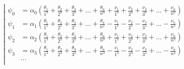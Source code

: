 \begin{equation*} \left| \begin{aligned}
\psi_0 &= \alpha_0
  \left(
  \frac{\theta_1}{1^0}
+ \frac{\theta_2}{2^0}
+ \frac{\theta_3}{3^0}
+ \ldots
+ \frac{\theta_n}{n^0}
+ \frac{\nu_1}{1^0}
+ \frac{\nu_2}{2^0}
+ \frac{\nu_3}{3^0}
+ \ldots
+ \frac{\nu_n}{n^0}
  \right) \\
%
\psi_1 &= \alpha_1
  \left(
  \frac{\theta_1}{1^1}
+ \frac{\theta_2}{2^1}
+ \frac{\theta_3}{3^1}
+ \ldots
+ \frac{\theta_n}{n^1}
- \frac{\nu_1}{1^1}
- \frac{\nu_2}{2^1}
- \frac{\nu_3}{3^1}
+ \ldots
- \frac{\nu_n}{n^1}
  \right) \\
%
\psi_2 &= \alpha_2
  \left(
  \frac{\theta_1}{1^2}
+ \frac{\theta_2}{2^2}
+ \frac{\theta_3}{3^2}
+ \ldots
+ \frac{\theta_n}{n^2}
+ \frac{\nu_1}{1^2}
+ \frac{\nu_2}{2^2}
+ \frac{\nu_3}{3^2}
+ \ldots
+ \frac{\nu_n}{n^2}
  \right) \\
%
\psi_3 &= \alpha_3
  \left(
  \frac{\theta_1}{1^3}
+ \frac{\theta_2}{2^3}
+ \frac{\theta_3}{3^3}
+ \ldots
+ \frac{\theta_n}{n^3}
- \frac{\nu_1}{1^3}
- \frac{\nu_2}{2^3}
- \frac{\nu_3}{3^3}
+ \ldots
- \frac{\nu_n}{n^3}
  \right) \\
%
&\ldots \\
\end{aligned} \right. \end{equation*}

